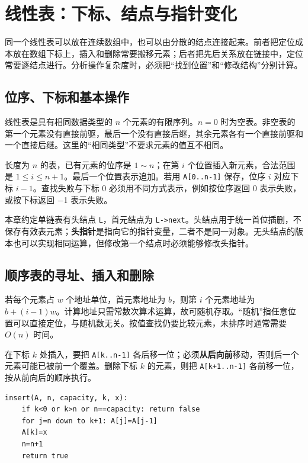 \chapter{线性表：下标、结点与指针变化}\label{ds-ch2}

同一个线性表可以放在连续数组中，也可以由分散的结点连接起来。前者把定位成本放在数组下标上，插入和删除常要搬移元素；后者把先后关系放在链接中，定位常要逐结点进行。分析操作复杂度时，必须把``找到位置''和``修改结构''分别计算。

\section{位序、下标和基本操作}\label{ds-02-01}

线性表是具有相同数据类型的 \(n\) 个元素的有限序列。\(n=0\) 时为空表。非空表的第一个元素没有直接前驱，最后一个没有直接后继，其余元素各有一个直接前驱和一个直接后继。这里的``相同类型''不要求元素的值互不相同。

长度为 \(n\) 的表，已有元素的位序是 \(1\sim n\)；在第 \(i\) 个位置插入新元素，合法范围是 \(1\le i\le n+1\)。最后一个位置表示追加。若用 \allowbreak{}\texttt{A{[}0..n-1{]}} 保存，位序 \(i\) 对应下标 \(i-1\)。查找失败与下标 0 必须用不同方式表示，例如按位序返回 0 表示失败，或按下标返回 −1 表示失败。

本章约定单链表有头结点 \allowbreak{}\texttt{L}，首元结点为 \allowbreak{}\texttt{L-\textgreater{}next}。头结点用于统一首位插删，不保存有效表元素；\textbf{头指针}是指向它的指针变量，二者不是同一对象。无头结点的版本也可以实现相同运算，但修改第一个结点时必须能够修改头指针。

\section{顺序表的寻址、插入和删除}\label{ds-02-02}

若每个元素占 \(w\) 个地址单位，首元素地址为 \(b\)，则第 \(i\) 个元素地址为 \(b+(i-1)w\)。计算地址只需常数次算术运算，故可随机存取。``随机''指任意位置可以直接定位，与随机数无关。按值查找仍要比较元素，未排序时通常需要 \(O(n)\) 时间。

在下标 \(k\) 处插入，要把 \allowbreak{}\texttt{A{[}k..n-1{]}} 各后移一位；必须\textbf{从后向前}移动，否则后一个元素可能已被前一个覆盖。删除下标 \(k\) 的元素，则把 \allowbreak{}\texttt{A{[}k+1..n-1{]}} 各前移一位，按从前向后的顺序执行。

\par\medskip\noindent
\begin{minipage}{\linewidth}
\begin{verbatim}
insert(A, n, capacity, k, x):
    if k<0 or k>n or n==capacity: return false
    for j=n down to k+1: A[j]=A[j-1]
    A[k]=x
    n=n+1
    return true
\end{verbatim}
\end{minipage}\par\medskip

